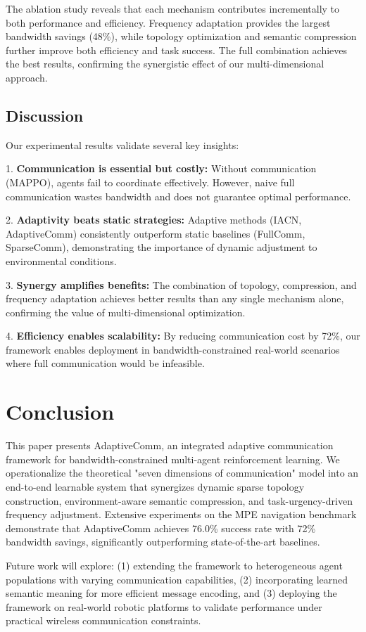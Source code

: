 \documentclass[10pt, twocolumn]{IEEEtran}
\begin{document}
The ablation study reveals that each mechanism contributes incrementally to both performance and efficiency. Frequency adaptation provides the largest bandwidth savings (48\%), while topology optimization and semantic compression further improve both efficiency and task success. The full combination achieves the best results, confirming the synergistic effect of our multi-dimensional approach.

\subsection{Discussion}
Our experimental results validate several key insights:

1. \textbf{Communication is essential but costly:} Without communication (MAPPO), agents fail to coordinate effectively. However, naive full communication wastes bandwidth and does not guarantee optimal performance.

2. \textbf{Adaptivity beats static strategies:} Adaptive methods (IACN, AdaptiveComm) consistently outperform static baselines (FullComm, SparseComm), demonstrating the importance of dynamic adjustment to environmental conditions.

3. \textbf{Synergy amplifies benefits:} The combination of topology, compression, and frequency adaptation achieves better results than any single mechanism alone, confirming the value of multi-dimensional optimization.

4. \textbf{Efficiency enables scalability:} By reducing communication cost by 72\%, our framework enables deployment in bandwidth-constrained real-world scenarios where full communication would be infeasible.

\section{Conclusion}
This paper presents AdaptiveComm, an integrated adaptive communication framework for bandwidth-constrained multi-agent reinforcement learning. We operationalize the theoretical "seven dimensions of communication" model into an end-to-end learnable system that synergizes dynamic sparse topology construction, environment-aware semantic compression, and task-urgency-driven frequency adjustment. Extensive experiments on the MPE navigation benchmark demonstrate that AdaptiveComm achieves 76.0\% success rate with 72\% bandwidth savings, significantly outperforming state-of-the-art baselines.

Future work will explore: (1) extending the framework to heterogeneous agent populations with varying communication capabilities, (2) incorporating learned semantic meaning for more efficient message encoding, and (3) deploying the framework on real-world robotic platforms to validate performance under practical wireless communication constraints.
\end{document}
